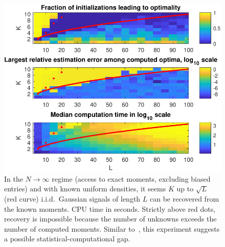 \documentclass[12pt]{article}
\newcommand{\1}{\mathbf{1}}
\theoremstyle{plain}
\theoremstyle{definition}
\theoremstyle{remark}
\theoremstyle{plain}
\theoremstyle{remark}
\theoremstyle{plain}
\theoremstyle{plain}
\theoremstyle{plain}
\numberwithin{equation}{section}
\begin{document}
\begin{figure}[t]
	\centering
	\includegraphics[width=.7\linewidth]{KLXP/XP1}
	\caption{In the $N \to \infty$ regime (access to exact moments, excluding biased entries) and with known uniform densities, it seems $K$ up to $\sqrt{L}$ (red curve) i.i.d.\ Gaussian signals of length $L$ can be recovered from the known moments. CPU time in seconds. Strictly above red dots, recovery is impossible because the number of unknowns exceeds the number of computed moments. Similar to~\cite[Fig.~4.1]{boumal2017heterogeneous}, this experiment suggests a possible statistical-computational gap.}
	\label{fig:KLXP}
\end{figure}
\end{document}
